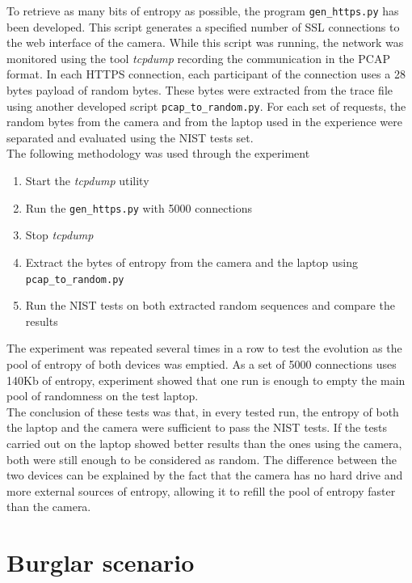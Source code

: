 To retrieve as many bits of entropy as possible, the program \texttt{gen\_https.py} has been developed.%
This script generates a specified number of SSL connections to the web interface of the camera.
While this script was running, the network was monitored using the tool \emph{tcpdump} recording the communication in the PCAP format.
In each HTTPS connection, each participant of the connection uses a 28 bytes payload of random bytes.
These bytes were extracted from the trace file using another developed script \texttt{pcap\_to\_random.py}.
For each set of requests, the random bytes from the camera and from the laptop used in the experience were separated and evaluated using the NIST tests set.\\

The following methodology was used through the experiment

\begin{enumerate}
\item Start the \emph{tcpdump} utility
\item Run the \texttt{gen\_https.py} with 5000 connections
\item Stop \emph{tcpdump}
\item Extract the bytes of entropy from the camera and the laptop using \texttt{pcap\_to\_random.py}
\item Run the NIST tests on both extracted random sequences and compare the results
\end{enumerate}

The experiment was repeated several times in a row to test the evolution as the pool of entropy of both devices was emptied.
As a set of 5000 connections uses 140Kb of entropy, experiment showed that one run is enough to empty the main pool of randomness on the test laptop.\\

The conclusion of these tests was that, in every tested run, the entropy of both the laptop and the camera were sufficient to pass the NIST tests.
If the tests carried out on the laptop showed better results than the ones using the camera, both were still enough to be considered as random.
The difference between the two devices can be explained by the fact that the camera has no hard drive and more external sources of entropy, allowing it to refill the pool of entropy faster than the camera.

\section{Burglar scenario}
\label{sec:dcs-burglar}

